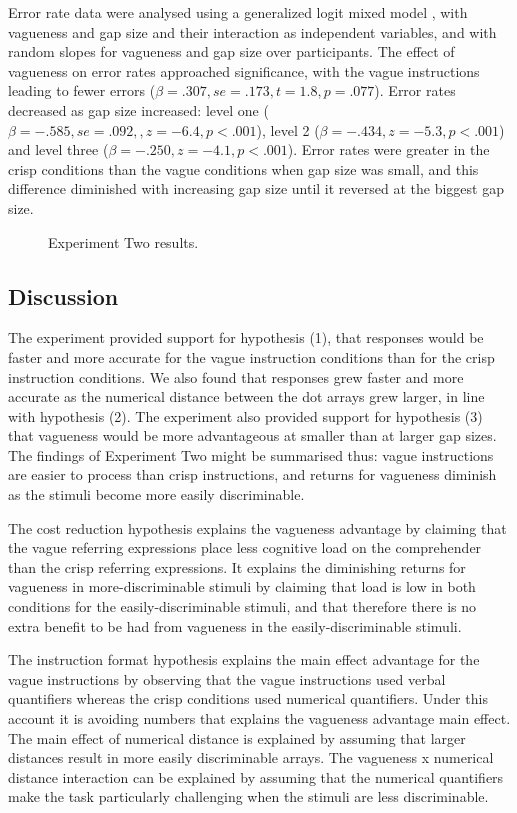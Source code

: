 \documentclass[doc,apacite]{apa6}
\begin{document}
\label{accann}
Error rate data were analysed using a generalized logit mixed model \cite{jaeger2008categorical}, with vagueness and gap size and their interaction as independent variables, and with random slopes for vagueness and gap size over participants. 
%
The effect of vagueness on error rates approached significance, with the vague instructions leading to fewer errors ($\beta=.307, se=.173, t=1.8, p=.077$).
%
Error rates decreased as gap size increased: level one ($\beta=-.585, se=.092, ,z=-6.4, p<.001$), level 2 ($\beta=-.434, z=-5.3,p<.001$) and level three ($\beta=-.250,z=-4.1, p<.001$). 
%
Error rates were greater in the crisp conditions than the vague conditions when gap size was small, and this difference diminished with increasing gap size until it reversed at the biggest gap size.
\begin{figure}[htbp]
\caption{Experiment Two results. }
\label{resultse2}
\end{figure}

\subsection{Discussion}

The experiment provided support for hypothesis (1), that responses would be faster and more accurate for the vague instruction conditions than for the crisp instruction conditions. 
We also found that responses grew faster and more accurate as the numerical distance between the dot arrays grew larger, in line with hypothesis (2).
The experiment also provided support for hypothesis (3) that vagueness would be more advantageous at smaller than at larger gap sizes.  
The findings of Experiment Two might be summarised thus: vague instructions are easier to process than crisp instructions, and returns for vagueness diminish as the stimuli become more easily discriminable. 

The cost reduction hypothesis explains the vagueness advantage by claiming that the vague referring expressions place less cognitive load on the comprehender than the crisp referring expressions. It explains the diminishing returns for vagueness in more-discriminable stimuli by claiming that load is low in both conditions for the easily-discriminable stimuli, and that therefore there is no extra benefit to be had from vagueness in the easily-discriminable stimuli. 

The instruction format hypothesis explains the main effect advantage for the vague instructions by observing that the vague instructions used verbal quantifiers whereas the crisp conditions used numerical quantifiers. Under this account it is avoiding numbers that explains the vagueness advantage main effect. The main effect of numerical distance is explained by assuming that larger distances result in more easily discriminable arrays. The vagueness x numerical distance interaction can be explained by assuming that the numerical quantifiers make the task particularly challenging when the stimuli are less discriminable.
\end{document}
